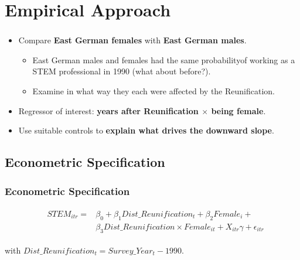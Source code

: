 \documentclass[11pt, aspectratio=1610, xcolor={dvipsnames}]{beamer}
\newcommand{\highlight}[1]{\textbf{\textcolor{PineGreen}{#1}}}
\begin{document}
	\section{Empirical Approach}
	\begin{frame}
		\frametitle{}
		
		\begin{itemize}
			\item Compare \highlight{East German females} with  \highlight{East German males}.
			\begin{itemize}
				\item East German males and females had the same probability\linebreak of working as a STEM professional in 1990 (what about before?).
				\item Examine in what way they each were affected by the Reunification.
			\end{itemize}
			\item Regressor of interest: \highlight{years after Reunification $\times$ being female}.
			\item Use suitable controls to \highlight{explain what drives the downward slope}.
		\end{itemize}
		
		
	\end{frame}
	
	\subsection{Econometric Specification}
	\begin{frame}
		\frametitle{Econometric Specification}
		
			{\linespread{1}\normalsize
				\begin{align}
					&\begin{aligned}
						\label{eq:spec}
						STEM_{itr} =& \beta_{0} + \beta_{1} Dist\_Reunification_{t} + \beta_{2} Female_{i} +\\
						&\beta_{3} Dist\_Reunification \times Female_{it} + X_{itr} \gamma + \epsilon_{itr}
					\end{aligned}
				\end{align}
				
				\vspace{1cm}
				
				\hspace{6.2em} with $Dist\_Reunification_{t} = Survey\_Year_{t} - 1990$.
			}
		
	\end{frame}
	
\end{document}

